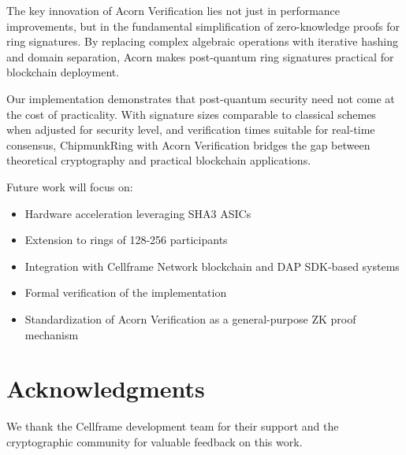 \documentclass[11pt,a4paper]{article}
\begin{document}
The key innovation of Acorn Verification lies not just in performance improvements, but in the fundamental simplification of zero-knowledge proofs for ring signatures. By replacing complex algebraic operations with iterative hashing and domain separation, Acorn makes post-quantum ring signatures practical for blockchain deployment.

Our implementation demonstrates that post-quantum security need not come at the cost of practicality. With signature sizes comparable to classical schemes when adjusted for security level, and verification times suitable for real-time consensus, ChipmunkRing with Acorn Verification bridges the gap between theoretical cryptography and practical blockchain applications.

Future work will focus on:
\begin{itemize}
\item Hardware acceleration leveraging SHA3 ASICs
\item Extension to rings of 128-256 participants
\item Integration with Cellframe Network blockchain and DAP SDK-based systems
\item Formal verification of the implementation
\item Standardization of Acorn Verification as a general-purpose ZK proof mechanism
\end{itemize}

\section{Acknowledgments}

We thank the Cellframe development team for their support and the cryptographic community for valuable feedback on this work.



\end{document}
